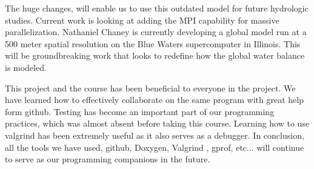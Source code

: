 \documentclass[pdftex,12pt,a4paper]{article}
\begin{document}
The huge changes, will enable us to use this outdated model for future hydrologic studies. Current work is looking at adding the MPI capability for massive parallelization. Nathaniel Chaney is currently developing a global model run at a 500 meter spatial resolution on the Blue Waters supercomputer in Illinois. This will be groundbreaking work that looks to redefine how the global water balance is modeled.

This project and the course has been beneficial to everyone in the project. We have learned how to effectively collaborate on the same program with great help form github. Testing has become an important part of our programming practices, which was almost absent before taking this course. Learning how to use valgrind has been extremely useful as it also serves as a debugger. In conclusion, all the tools we have used, github, Doxygen, Valgrind , gprof, etc... will continue to serve as our programming companions in the future.
\end{document}
